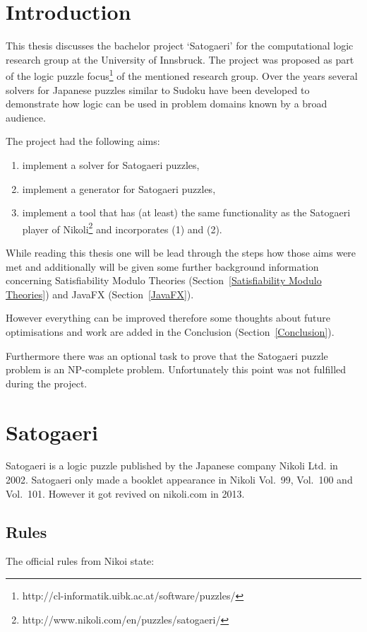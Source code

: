 
\chapter{Introduction} \label{Introduction}
This thesis discusses the bachelor project `Satogaeri' for the computational logic research group at the University of Innsbruck. The project was proposed as part of the logic puzzle focus\footnote{http://cl-informatik.uibk.ac.at/software/puzzles/} of the mentioned research group. Over the years several solvers for Japanese puzzles similar to Sudoku have been developed to demonstrate how logic can be used in problem domains known by a broad audience.

The project had the following aims: 
\begin{enumerate}
	\item implement a solver for Satogaeri puzzles,
	\item implement a generator for Satogaeri puzzles,
	\item implement a tool that has (at least) the same functionality as the Satogaeri player of Nikoli\footnote{http://www.nikoli.com/en/puzzles/satogaeri/} and incorporates (1) and (2).
\end{enumerate}

While reading this thesis one will be lead through the steps how those aims were met and additionally will be given some further background information concerning Satisfiability Modulo Theories (Section~\ref{Satisfiability Modulo Theories}) and JavaFX (Section~\ref{JavaFX}).

However everything can be improved therefore some thoughts about future optimisations and work are added in the Conclusion (Section~\ref{Conclusion}).

Furthermore there was an optional task to prove that the Satogaeri puzzle problem is an NP-complete problem. Unfortunately this point was not fulfilled during the project.

\chapter{Satogaeri} \label{Satogaeri}
Satogaeri is a logic puzzle published by the Japanese company Nikoli Ltd. in 2002. Satogaeri only made a booklet appearance in Nikoli Vol.\ 99, Vol.\ 100 and Vol.\ 101. However it got revived on nikoli.com in 2013.

\section{Rules}
The official rules from Nikoi state:


